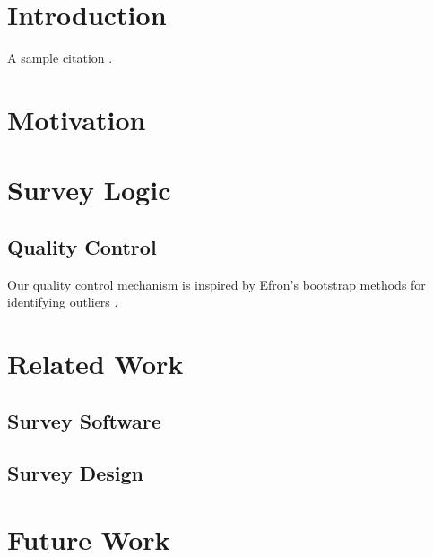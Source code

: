 \documentclass{article}
\begin{document}
\section{Introduction}
A sample citation \cite{dummyentry}.
\section{Motivation}
\section{Survey Logic}
\subsection{Quality Control}
Our quality control mechanism is inspired by Efron's bootstrap methods for identifying outliers \cite{bootstrap}.
\section{Related Work}
\subsection{Survey Software}
\subsection{Survey Design}
\section{Future Work}


\end{document}

